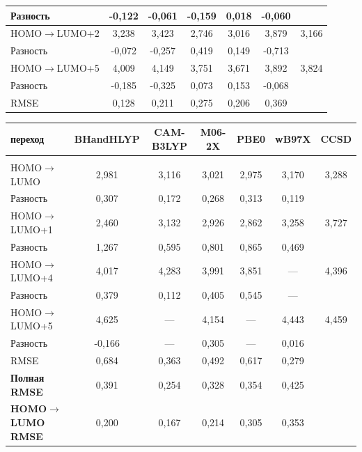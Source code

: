 \documentclass[a4paper,12pt]{article}
\newcommand{\rarr}{\rightarrow}
\begin{document}
\begin{onehalfspace}
\begin{table}[H]
\begin{tabular}{|l|c|c|c|c|c|c|}
			Разность          & -0,122    & -0,061    & -0,159 & 0,018  & -0,060 &       \\ \hline
			HOMO$\rarr$LUMO+2 & 3,238     & 3,423     & 2,746  & 3,016  & 3,879  & 3,166 \\ \hline
			Разность          & -0,072    & -0,257    & 0,419  & 0,149  & -0,713 &       \\ \hline
			HOMO$\rarr$LUMO+5 & 4,009     & 4,149     & 3,751  & 3,671  & 3,892  & 3,824 \\ \hline
			Разность          & -0,185    & -0,325    & 0,073  & 0,153  & -0,068 &       \\ \hline
			RMSE              & 0,128     & 0,211     & 0,275  & 0,206  & 0,369  &       \\ \hline
		\end{tabular}
	\end{table}
	
		\begin{table}[H]
		\centering
		\begin{tabular}{|l|c|c|c|c|c|c|}
			\hline
			\textbf{переход}        & \textbf{BHandHLYP} & \textbf{CAM-B3LYP} & \textbf{M06-2X} & \textbf{PBE0}  & \textbf{wB97X} & \textbf{CCSD}  \\ \hline \hline
			\multicolumn{7}{|c|}{\ce{Cu5[SCH3]4}}                                        \\ \hline
			HOMO$\rarr$LUMO   & 2,981     & 3,116     & 3,021  & 2,975  & 3,170  & 3,288 \\ \hline
			Разность          & 0,307     & 0,172     & 0,268  & 0,313  & 0,119  &       \\ \hline
			HOMO$\rarr$LUMO+1 & 2,460     & 3,132     & 2,926  & 2,862  & 3,258  & 3,727 \\ \hline
			Разность          & 1,267     & 0,595     & 0,801  & 0,865  & 0,469  &       \\ \hline
			HOMO$\rarr$LUMO+4 & 4,017     & 4,283     & 3,991  & 3,851  & —      & 4,396 \\ \hline
			Разность          & 0,379     & 0,112     & 0,405  & 0,545  & —      &       \\ \hline
			HOMO$\rarr$LUMO+5 & 4,625     & —         & 4,154  & —      & 4,443  & 4,459 \\ \hline
			Разность          & -0,166    & —         & 0,305  & —      & 0,016  &       \\ \hline
			RMSE              & 0,684     & 0,363     & 0,492  & 0,617  & 0,279  &       \\ \hline \hline
			\textbf{Полная RMSE} & 0,391     & 0,254     & 0,328  & 0,354  & 0,425  &      \\ \hline \hline
			\textbf{HOMO$\rarr$LUMO RMSE} & 0,200     & 0,167     & 0,214  & 0,305  & 0,353  &      \\
			\hline
							

\end{tabular}
\end{table}
\end{onehalfspace}
\end{document}
